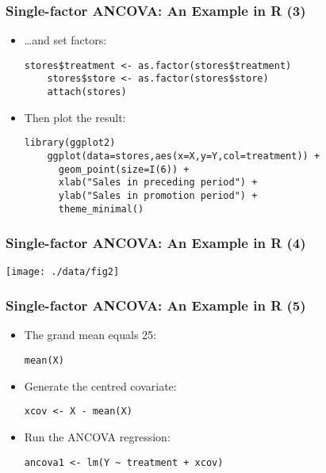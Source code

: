 \documentclass[10pt]{beamer}
\theoremstyle{definition}
\begin{document}
\begin{frame}[fragile]
\frametitle{Single-factor ANCOVA: An Example in R (3)}
\begin{itemize}
	\item \ldots and set factors:
	\begin{lstlisting}[style = rstyle, breaklines] 
	stores$treatment <- as.factor(stores$treatment)
	stores$store <- as.factor(stores$store)
	attach(stores)
	\end{lstlisting}
	\item Then plot the result:
	\begin{lstlisting}[style = rstyle, breaklines] 
	library(ggplot2)
	ggplot(data=stores,aes(x=X,y=Y,col=treatment)) + 
	  geom_point(size=I(6)) + 
	  xlab("Sales in preceding period") + 
	  ylab("Sales in promotion period") +
	  theme_minimal()
	\end{lstlisting}
\end{itemize}
\end{frame}

\begin{frame}[fragile]
\frametitle{Single-factor ANCOVA: An Example in R (4)}
\centerline{\texttt{[image: ./data/fig2]}}
\end{frame}

\begin{frame}[fragile]
\frametitle{Single-factor ANCOVA: An Example in R (5)}
\begin{itemize}
	\item The grand mean equals 25:
	\begin{lstlisting}[style = rstyle, breaklines] 
	mean(X)
	\end{lstlisting}
	\item Generate the centred covariate:
	\begin{lstlisting}[style = rstyle, breaklines] 
	xcov <- X - mean(X) 
	\end{lstlisting}
	\item Run the ANCOVA regression:
	\begin{lstlisting}[style = rstyle, breaklines] 
	ancova1 <- lm(Y ~ treatment + xcov)
	\end{lstlisting}
\end{itemize}
\end{frame}
\end{document}
